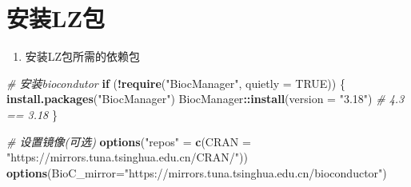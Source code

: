 \documentclass[
]{book}
\newenvironment{Shaded}{\begin{snugshade}}{\end{snugshade}}
\newcommand{\AttributeTok}[1]{\textcolor[rgb]{0.13,0.29,0.53}{#1}}
\newcommand{\CommentTok}[1]{\textcolor[rgb]{0.56,0.35,0.01}{\textit{#1}}}
\newcommand{\ConstantTok}[1]{\textcolor[rgb]{0.56,0.35,0.01}{#1}}
\newcommand{\ControlFlowTok}[1]{\textcolor[rgb]{0.13,0.29,0.53}{\textbf{#1}}}
\newcommand{\FunctionTok}[1]{\textcolor[rgb]{0.13,0.29,0.53}{\textbf{#1}}}
\newcommand{\NormalTok}[1]{#1}
\newcommand{\OtherTok}[1]{\textcolor[rgb]{0.56,0.35,0.01}{#1}}
\newcommand{\SpecialCharTok}[1]{\textcolor[rgb]{0.81,0.36,0.00}{\textbf{#1}}}
\newcommand{\StringTok}[1]{\textcolor[rgb]{0.31,0.60,0.02}{#1}}
\providecommand{\tightlist}{%
  \setlength{\itemsep}{0pt}\setlength{\parskip}{0pt}}
\begin{document}
\section{安装LZ包}\label{ux5b89ux88c5lzux5305}

\begin{enumerate}
\def\labelenumi{\arabic{enumi}.}
\tightlist
\item
  安装LZ包所需的依赖包
\end{enumerate}

\begin{Shaded}
\begin{Highlighting}[]
\CommentTok{\# 安装biocondutor}
\ControlFlowTok{if}\NormalTok{ (}\SpecialCharTok{!}\FunctionTok{require}\NormalTok{(}\StringTok{"BiocManager"}\NormalTok{, }\AttributeTok{quietly =} \ConstantTok{TRUE}\NormalTok{)) \{}
  \FunctionTok{install.packages}\NormalTok{(}\StringTok{"BiocManager"}\NormalTok{)}
\NormalTok{  BiocManager}\SpecialCharTok{::}\FunctionTok{install}\NormalTok{(}\AttributeTok{version =} \StringTok{"3.18"}\NormalTok{) }\CommentTok{\# 4.3 == 3.18}
\NormalTok{\}}

\CommentTok{\# 设置镜像(可选)}
\FunctionTok{options}\NormalTok{(}\StringTok{"repos"} \OtherTok{=} \FunctionTok{c}\NormalTok{(}\AttributeTok{CRAN =} \StringTok{"https://mirrors.tuna.tsinghua.edu.cn/CRAN/"}\NormalTok{)) }
\FunctionTok{options}\NormalTok{(}\AttributeTok{BioC\_mirror=}\StringTok{"https://mirrors.tuna.tsinghua.edu.cn/bioconductor"}\NormalTok{)}


\end{Highlighting}
\end{Shaded}
\end{document}
